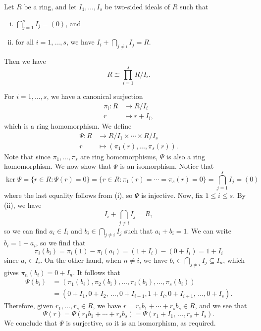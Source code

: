 \begin{theo}{}
Let $R$ be a ring, and let $I_1, \dots, I_s$ be two-sided ideals of $R$ such that 
\begin{enumerate}[(i)]
    \item $\bigcap_{j=1}^s I_j = (0)$, and 
    \item for all $i = 1, \dots, s$, we have $I_i + \bigcap_{j\neq i} I_j = R$. 
\end{enumerate}
Then we have 
\[ R \cong \prod_{i=1}^s R/I_i. \]
\end{theo}
\begin{pf}
For $i = 1, \dots, s$, we have a canonical surjection 
\begin{align*} \pi_i : R &\to R/I_i \\ r &\mapsto r + I_i, \end{align*}
which is a ring homomorphism. We define 
\begin{align*} \Psi : R &\to R/I_1 \times \cdots \times R/I_s \\ r &\mapsto (\pi_1(r), \dots, \pi_s(r)). 
\end{align*}
Note that since $\pi_1, \dots, \pi_s$ are ring homomorphisms, $\Psi$ is also a ring homomorphism. 
We now show that $\Psi$ is an isomorphism. Notice that 
\[ \ker\Psi = \{r \in R : \Psi(r) = 0\} = \{r \in R : \pi_1(r) = \cdots = \pi_s(r) = 0\} 
= \bigcap_{j=1}^s I_j = (0) \]
where the last equality follows from (i), so $\Psi$ is injective. Now, fix $1 \leq i \leq s$. 
By (ii), we have 
\[ I_i + \bigcap_{j\neq i} I_j = R, \]
so we can find $a_i \in I_i$ and $b_i \in \bigcap_{j\neq i} I_j$ such that $a_i + b_i = 1$. 
We can write $b_i = 1 - a_i$, so we find that 
\[ \pi_i(b_i) = \pi_i(1) - \pi_i(a_i) = (1 + I_i) - (0 + I_i) = 1 + I_i \]
since $a_i \in I_i$. 
On the other hand, when $n \neq i$, we have $b_i \in \bigcap_{j\neq i} I_j \subseteq I_n$, which 
gives $\pi_n(b_i) = 0 + I_n$. It follows that 
\begin{align*} \Psi(b_i) &= (\pi_1(b_i), \pi_2(b_i), \dots, \pi_i(b_i), \dots, \pi_s(b_i)) \\
&= (0 + I_1, 0 + I_2,\, \dots , 0 + I_{i-1}, 1 + I_i, 0 + I_{i+1},\, \dots, 0 + I_s). \end{align*}
Therefore, given $r_1, \dots, r_s \in R$, we have $r = r_1b_1 + \cdots + r_sb_s \in R$, and we see that
\[ \Psi(r) = \Psi(r_1b_1 + \cdots + r_sb_s) = \Psi(r_1 + I_1,\, \dots, r_s + I_s). \]
We conclude that $\Psi$ is surjective, so it is an isomorphism, as required. 
\end{pf}

